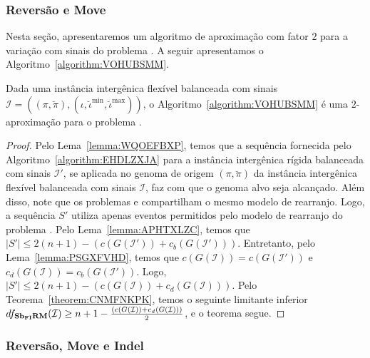 \subsubsection{Reversão e Move}

Nesta seção, apresentaremos um algoritmo de aproximação com fator $2$ para a variação com sinais do problema \SbFIRM{}. A seguir apresentamos o Algoritmo~\ref{algorithm:VOHUBSMM}.



\begin{theorem}\label{theorem:NBFXUXJG}
Dada uma instância intergênica flexível balanceada com sinais $\mathcal{I} = ((\pi,\breve\pi),(\iota,\breve\iota^{\min},\breve\iota^{\max}))$, o Algoritmo~\ref{algorithm:VOHUBSMM} é uma $2$-aproximação para o problema \SbFIRM{}.
\end{theorem}
\begin{proof}
Pelo Lema~\ref{lemma:WQOEFBXP}, temos que a sequência fornecida pelo Algoritmo~\ref{algorithm:EHDLZXJA} para a instância intergênica rígida balanceada com sinais $\mathcal{I'}$, se aplicada no genoma de origem $(\pi,\breve\pi)$ da instância intergênica flexível balanceada com sinais $\mathcal{I}$, faz com que o genoma alvo seja alcançado. Além disso, note que os problemas \SbIRM{} e \SbFIRM{} compartilham o mesmo modelo de rearranjo. Logo, a sequência $S'$ utiliza apenas eventos permitidos pelo modelo de rearranjo do problema \SbFIRM{}. Pelo Lema~\ref{lemma:APHTXLZC}, temos que $|S'| \le 2(n + 1) - (c(G(\mathcal{I}')) + c_b(G(\mathcal{I}')))$. Entretanto, pelo Lema~\ref{lemma:PSGXFVHD}, temos que $c(G(\mathcal{I})) = c(G(\mathcal{I}'))$ e $c_d(G(\mathcal{I})) = c_b(G(\mathcal{I}'))$. Logo, $|S'| \le 2(n + 1) - (c(G(\mathcal{I})) + c_d(G(\mathcal{I})))$. Pelo Teorema~\ref{theorem:CNMFNKPK}, temos o seguinte limitante inferior $df_{\textbf{Sb\textsubscript{FI}RM}}(\mathcal{I}) \ge {n+1} - \frac{(c(G(\mathcal{I})) + c_d(G(\mathcal{I})))}{2}$, e o teorema segue.
\end{proof}

\subsubsection{Reversão, Move e Indel}

